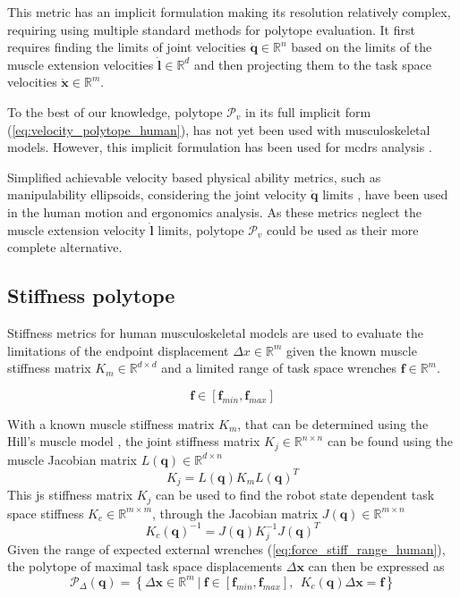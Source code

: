 This metric has an implicit formulation making its resolution relatively complex, requiring using multiple standard methods for polytope evaluation. It first requires finding the limits of joint velocities $\dot{\bm{q}} \in \mathbb{R}^n$ based on the limits of the muscle extension velocities $\dot{\bm{l}} \in \mathbb{R}^d$ and then projecting them to the task space velocities $\dot{\bm{x}} \in \mathbb{R}^m$. 

To the best of our knowledge, polytope $\mathcal{P}_v$ in its full implicit form (\ref{eq:velocity_polytope_human}), has not yet been used with musculoskeletal models. However, this implicit formulation has been used for \glspl{mcdr} analysis \cite{Muralidharan2022}.

Simplified achievable velocity based physical ability metrics, such as manipulability ellipsoids, considering the joint velocity $\dot{\bm{q}}$ limits \cite{Chiu1988,petric2019assistive,Yang2017}, have been used in the human motion and ergonomics analysis. As these metrics neglect the muscle extension velocity $\dot{\bm{l}}$ limits, polytope $\mathcal{P}_v$ could be used as their more complete alternative. 

\subsection{Stiffness polytope}
\label{ch:human_stiffness_poly}
Stiffness metrics for human musculoskeletal models are used to evaluate the limitations of the endpoint displacement $\Delta x \in \mathbb{R}^m$ given the known muscle stiffness matrix $K_m \in \mathbb{R}^{d\times d}$ and a limited range of task space wrenches $\bm{f} \in \mathbb{R}^m$. 

\begin{equation}
    \bm{f}\in\left[\bm{f}_{min}, \bm{f}_{max} \right]
    \label{eq:force_stiff_range_human}
\end{equation}

With a known muscle stiffness matrix $K_m$, that can be determined using the Hill's muscle model \cite{LATASH1993653}, the joint stiffness matrix $K_j\in \mathbb{R}^{n\times n}$ can be found using the muscle Jacobian matrix $L(\bm{q}) \in \mathbb{R}^{d\times n}$
\begin{equation}
    K_j = L(\bm{q}) K_m L(\bm{q})^T 
\end{equation}
This \gls{js} stiffness matrix $K_j$ can be used to find the robot state dependent task space stiffness $K_c  \in \mathbb{R}^{m\times m}$, through the Jacobian matrix $J(\bm{q})\in\mathbb{R}^{m\times n}$  \cite{Salisbury1980,Ajoudani2018,Inouye2016}
\begin{equation}
     K_c(\bm{q})^{-1} = J(\bm{q}) K_j^{-1}J(\bm{q})^T
\end{equation}
Given the range of expected external wrenches (\ref{eq:force_stiff_range_human}), the polytope of maximal task space displacements $\Delta\bm{x}$ can then be expressed as
\begin{equation}
    \mathcal{P}_\Delta(\bm{q}) = \left\{ \Delta\bm{x} \in \mathbb{R}^m ~|~ \bm{f}\in\left[\bm{f}_{min}, \bm{f}_{max} \right], ~~ K_c(\bm{q})\Delta\bm{x} = \bm{f} \right\}
    \label{eq:stiffness_human_simple}
\end{equation}



